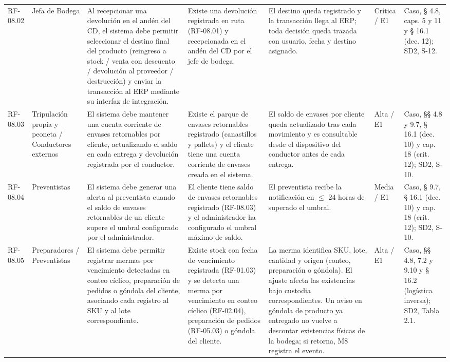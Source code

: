 {\begin{longtable}{@{}F{0.062} F{0.080} F{0.195} F{0.160} F{0.240} F{0.093} F{0.170}@{}}
  RF-08.02 & Jefa de Bodega & Al recepcionar una devolución en el andén del CD, el sistema debe permitir seleccionar el destino final del producto (reingreso a stock / venta con descuento / devolución al proveedor / destrucción) y enviar la transacción al ERP mediante su interfaz de integración. & Existe una devolución registrada en ruta (RF-08.01) y recepcionada en el andén del CD por el jefe de bodega. & El destino queda registrado y la transacción llega al ERP; toda decisión queda trazada con usuario, fecha y destino asignado. & Crítica / E1 & Caso, § 4.8, caps. 5 y 11 y § 16.1 (dec. 12); SD2, S-12. \\
  RF-08.03 & Tripulación propia y peoneta / Conductores externos & El sistema debe mantener una cuenta corriente de envases retornables por cliente, actualizando el saldo en cada entrega y devolución registrada por el conductor. & Existe el parque de envases retornables registrado (canastillos y pallets) y el cliente tiene una cuenta corriente de envases creada en el sistema. & El saldo de envases por cliente queda actualizado tras cada movimiento y es consultable desde el dispositivo del conductor antes de cada entrega. & Alta / E1 & Caso, §§ 4.8 y 9.7, § 16.1 (dec. 10) y cap. 18 (crit. 12); SD2, S-10. \\
  RF-08.04 & Preventistas & El sistema debe generar una alerta al preventista cuando el saldo de envases retornables de un cliente supere el umbral configurado por el administrador. & El cliente tiene saldo de envases retornables registrado (RF-08.03) y el administrador ha configurado el umbral máximo de saldo. & El preventista recibe la notificación en $\le$ 24 horas de superado el umbral. & Media / E1 & Caso, § 9.7, § 16.1 (dec. 10) y cap. 18 (crit. 12); SD2, S-10. \\
  RF-08.05 & Preparadores / Preventistas & El sistema debe permitir registrar mermas por vencimiento detectadas en conteo cíclico, preparación de pedidos o góndola del cliente, asociando cada registro al SKU y al lote correspondiente. & Existe stock con fecha de vencimiento registrada (RF-01.03) y se detecta una merma por vencimiento en conteo cíclico (RF-02.04), preparación de pedidos (RF-05.03) o góndola del cliente. & La merma identifica SKU, lote, cantidad y origen (conteo, preparación o góndola). El ajuste afecta las existencias bajo custodia correspondientes. Un aviso en góndola de producto ya entregado no vuelve a descontar existencias físicas de la bodega; si retorna, M8 registra el evento. & Alta / E1 & Caso, §§ 4.8, 7.2 y 9.10 y § 16.2 (logística inversa); SD2, Tabla 2.1. \\

\end{longtable}}
